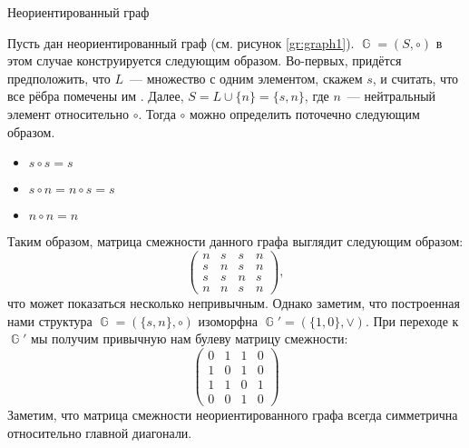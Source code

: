 \begin{marginfigure}
    \caption{Неориентированный граф}
    \label{gr:graph1}
    \begin{center}
        
    \end{center}
\end{marginfigure}
\begin{example}
    \label{exmpl:undirectedGraphMatrix}
    Пусть дан неориентированный граф (см. рисунок \ref{gr:graph1}).
    $\BbbG = (S, \circ)$ в этом случае конструируется следующим образом.
    Во-первых, придётся предположить, что $L$~--- множество с одним элементом, скажем $s$, и считать, что все рёбра помечены им%
    .
    Далее, $S = L \cup{\{n\}} = \{s,n\}$, где $n$~--- нейтральный элемент относительно $\circ$.
    Тогда $\circ$ можно определить поточечно следующим образом.
    \begin{itemize}
        \item $s \circ s = s$
        \item $s \circ n = n \circ s = s$
        \item $n \circ n = n$
    \end{itemize}

    Таким образом, матрица смежности данного графа выглядит следующим образом:
    \[
        \begin{pmatrix}
            n & s & s & n \\
            s & n & s & n \\
            s & s & n & s \\
            n & n & s & n
        \end{pmatrix},
    \]
    что может показаться несколько непривычным.
    Однако заметим, что построенная нами структура $\BbbG = (\{s,n\}, \circ)$ изоморфна $\BbbG' = (\{1,0\}, \lor)$.
    При переходе к $\BbbG'$ мы получим привычную нам булеву матрицу смежности:
    \[
        \begin{pmatrix}
            0 & 1 & 1 & 0 \\
            1 & 0 & 1 & 0 \\
            1 & 1 & 0 & 1 \\
            0 & 0 & 1 & 0
        \end{pmatrix}
    \]
    Заметим, что матрица смежности неориентированного графа всегда симметрична относительно главной диагонали.
\end{example}

